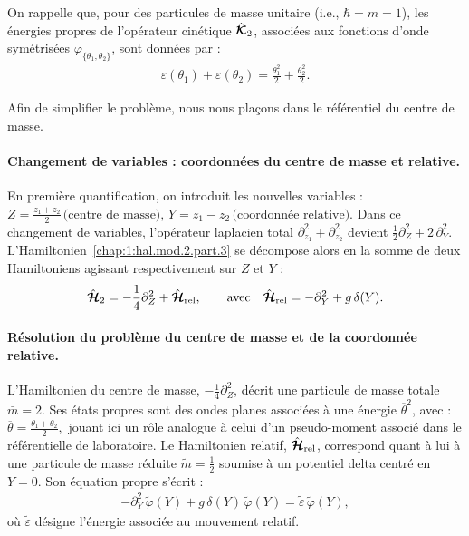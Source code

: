 On rappelle que, pour des particules de masse unitaire (i.e., \(\hbar = m = 1\)), les énergies propres de l’opérateur cinétique \(\hat{\bm{\mathcal{K}}}_2\), associées aux fonctions d’onde symétrisées \(\varphi_{\{ \theta_1 , \theta_2 \}}\), sont données par :
\begin{eqnarray}
	\varepsilon(\theta_1) + \varepsilon(\theta_2) = \frac{\theta_1^2}{2} + \frac{\theta_2^2}{2}.
\end{eqnarray}

Afin de simplifier le problème, nous nous plaçons dans le référentiel du centre de masse.

\paragraph{Changement de variables : coordonnées du centre de masse et relative.}

En première quantification, on introduit les nouvelles variables :
\(
Z = \frac{z_1 + z_2}{2} \, \text{(centre de masse)}, \, Y = z_1 - z_2 \, \text{(coordonnée relative)}.
\)
Dans ce changement de variables, l’opérateur laplacien total 
\(
\partial_{z_1}^2 + \partial_{z_2}^2 
\)
devient
\(
\frac{1}{2} \partial_Z^2 + 2 \, \partial_Y^2.
\)
L’Hamiltonien~\eqref{chap:1:hal.mod.2.part.3} se décompose alors en la somme de deux Hamiltoniens agissant respectivement sur \(Z\) et \(Y\) :
\begin{eqnarray}\label{chap:1:hal.mod.2.part.4}
	\hat{\bm{\mathcal{H}}}_2 = -\frac{1}{4} \partial_Z^2 + \hat{\bm{\mathcal{H}}}_{\text{rel}}, \qquad \text{avec} \quad \hat{\bm{\mathcal{H}}}_{\text{rel}} = - \partial_Y^2 + g \, \delta(Y).
\end{eqnarray}

\paragraph{Résolution du problème du centre de masse et de la coordonnée relative.}

L’Hamiltonien du centre de masse, \(-\frac{1}{4} \partial_Z^2\), décrit une particule de masse totale \(\bar{m} = 2\). Ses états propres sont des ondes planes associées à une énergie \(\overline{\theta}^2\), avec :
\(
\overline{\theta} = \frac{\theta_1 + \theta_2}{2},
\)
jouant ici un rôle analogue à celui d’un pseudo-moment associé dans le référentielle de laboratoire.
Le Hamiltonien relatif, \(\hat{\bm{\mathcal{H}}}_{\text{rel}}\), correspond quant à lui à une particule de masse réduite \(\tilde{m} = \frac{1}{2}\) soumise à un potentiel delta centré en \(Y = 0\). Son équation propre s’écrit :
\begin{eqnarray}\label{chap:1:hal.mod.2.part.5}
	- \partial_Y^2 \, \tilde{\varphi}(Y) + g \, \delta(Y) \, \tilde{\varphi}(Y) = \tilde{\varepsilon} \, \tilde{\varphi}(Y),
\end{eqnarray}
où \(\tilde{\varepsilon}\) désigne l’énergie associée au mouvement relatif.

